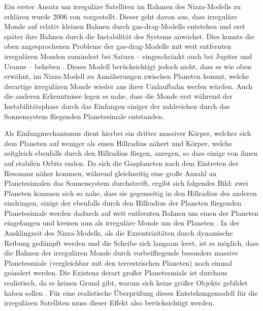 \documentclass[12pt,a4paper,twoside,open=right,bibliography=totoc]{scrbook}
\renewcommand{\cite}{ \citep}
\begin{document}
Ein erster Ansatz um irreguläre Satelliten im Rahmen des Nizza-Modells zu erklären wurde 2006 von \cite{Cuk2006} vorgestellt. Dieser geht davon aus, dass irreguläre Monde auf relativ kleinen Bahnen durch \glqq gas-drag\grqq-Modelle entstehen und erst später ihre Bahnen durch die Instabilität des Systems anwächst. Dies konnte die oben angesprochenen Probleme der \glqq gas-drag\grqq-Modelle mit weit entfernten irregulären Monden zumindest bei Saturn – eingeschränkt auch bei Jupiter und Uranus – beheben\cite{Cuk2006}.
Dieses Modell berücksichtigt jedoch nicht, dass es wie oben erwähnt, im Nizza-Modell zu Annäherungen zwischen Planeten kommt, welche derartige irregulären Monde wieder aus ihrer Umlaufbahn werfen würden. Auch die anderen Erkenntnisse legen es nahe, dass die Monde erst während der Instabilitätsphase durch das Einfangen einiger der zahlreichen durch das Sonnensystem fliegenden Planetesimale entstanden.

Als Einfangmechanismus dient hierbei ein dritter massiver Körper,
welcher sich dem Planeten auf weniger als einen Hillradius nähert und Körper,
welche zeitgleich ebenfalls durch den Hillradius fliegen, anregen, so dass einige von ihnen auf stabilen Orbits enden.
Da sich die Gasplaneten nach dem Eintreten der Resonanz näher kommen, während gleichzeitig eine große Anzahl an Planetesimalen das Sonnensystem durchstreift,
ergibt sich folgendes Bild: zwei Planeten kommen sich so nahe, dass sie gegenseitig in den Hillradius des anderen eindringen,
einige der ebenfalls durch den Hillradius der Planeten fliegenden Planetesimale werden dadurch auf weit entfernten Bahnen um einen der Planeten eingefangen und kreisen nun als irreguläre Monde um den Planeten\cite{Nesvorny2007}.
In der Ausklingzeit des Nizza-Modells, als die Exzentrizitäten durch dynamische Reibung gedämpft werden und die Scheibe sich langsam leert, ist es möglich, dass die Bahnen der irregulären Monde durch vorbeifliegende besonders massive Planetesmiale (vergleichbar mit den terrestrischen Planeten) noch einmal geändert werden.
Die Existenz derart großer Planetesmiale ist durchaus realistisch, da es keinen Grund gibt, warum sich keine größer Objekte gebildet haben sollen\cite{Nesvorny2007}. Für eine realistische Überprüfung dieses Entstehungsmodell für die irregulären Satelliten muss dieser Effekt also berücksichtigt werden.
\end{document}
